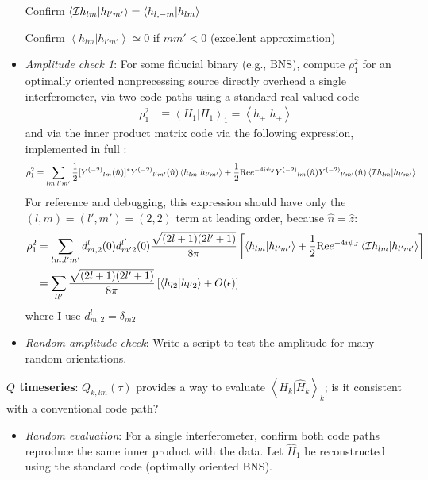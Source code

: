 \documentclass[twocolumn,prd,nofootinbib]{revtex4}
\newcommand\Y[1]{Y^{(#1)}{}}
\newcommand\qmstateproduct[2]{\left\langle#1|#2\right\rangle}
\begin{document}
\begin{widetext}
\begin{itemize}
Confirm  $\qmstateproduct{{\cal I} h_{lm}}{h_{l'm'}} = \qmstateproduct{h_{l,-m}}{h_{lm}}$

Confirm $\qmstateproduct{h_{lm}}{h_{l'm'}}\simeq 0$ if $m m' <0$  (excellent approximation)

\item \emph{Amplitude check 1}: For some fiducial binary (e.g., BNS), compute $\rho_1^2$ for an optimally oriented nonprecessing source directly overhead a
  single interferometer, via two code paths using a standard real-valued code
\begin{align}
\rho^2_1 &\equiv\qmstateproduct{H_1}{H_1}_1 = \qmstateproduct{h_+}{h_+} 
\end{align}
and via the inner product matrix code  via the following expression, implemented in full :
\begin{align}
\rho^2_1& = \sum_{lm,l'm'} \frac{1}{2} [\Y{-2}_{lm}(\hat{n})]^*\Y{-2}_{l'm'}(\hat{n})\qmstateproduct{h_{lm}}{h_{l'm'}}
  +\frac{1}{2}\text{Re}e^{-4i\psi_J}\Y{-2}_{lm}(\hat{n})\Y{-2}_{l'm'}(\hat{n})\qmstateproduct{{\cal I}h_{lm}}{h_{l'm'}}
\end{align}
For reference and debugging, this expression  should have only the $(l,m)=(l',m')=(2,2)$ term at leading order, because $\hat{n}=\hat{z}$:
\begin{align}
 \rho_1^2&= \sum_{lm,l'm'}d^l_{m,2}(0)d^{l'}_{m'2}(0) \frac{\sqrt{(2l+1)(2l'+1)}}{8\pi} \left[\qmstateproduct{h_{lm}}{h_{l'm'}} 
 + \frac{1}{2} \text{Re}e^{-4i\psi_J}  \qmstateproduct{{\cal I}h_{lm}}{h_{l'm'}}
\right] \\
 &= \sum_{ll'}\frac{\sqrt{(2l+1)(2l'+1)}}{8\pi} \left[\qmstateproduct{h_{l2}}{h_{l'2}}  + O(\epsilon)
\right]
\end{align}
where I use $d^l_{m,2}=\delta_{m2}$

\item \emph{Random amplitude check}: Write a script to test the amplitude for many random orientations.
\end{itemize}

\noindent \textbf{$Q$ timeseries}: $Q_{k,lm}(\tau)$ provides a way to evaluate $\qmstateproduct{H_k}{\hat{H}_k}_k$; is
it consistent with a conventional code path?  
\begin{itemize}
\item \emph{Random evaluation}: For a single interferometer, confirm both code paths reproduce the same inner product
  with the data.   Let $\hat{H}_1$ be reconstructed using the standard code (optimally oriented BNS).
\end{itemize}



\end{widetext}
\end{document}
